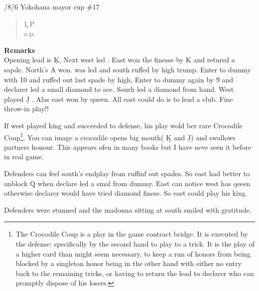 \vspace{0.5cm}
/8/6 Yokohana mayor cup \#17
\begin{quote}
%
  {}%
  {}
  {}%
  {}%
\end{quote}
\begin{quote}
\begin{bidding}
1\c  \> P  \s {}\h \\
a.p.
\end{bidding}
\end{quote}
{\bf Remarks}\\
Opening lead is \c K, Next west led . East won the
finesse by \s K and retured a sapde. North's \s A won. 
was led and south ruffed by high trump. Enter to dummy with 
\h 10 and ruffed out last spade by high, Enter to dummy again by \h 9
and declarer led a small diamond to ace. Sourh led a diamond from hand.
West played \d J . Alas east won by queen. All east could do is to lead a club.
Fine throw-in play!! 

If west played king and succeeded to defense,
his play wold ber rare Crocodile Coup\footnote{
The Crocodile Coup is a play in the game contract bridge. It is executed by the defense: specifically by the second hand to play to a trick. It is the play of a higher card than might seem necessary, to keep a run of honors from being blocked by a singleton honor being in the other hand with either no entry back to the remaining tricks, or having to return the lead to declarer who can promptly dispose of his losers. 
}.  You can image a crocodile opens big mouth( \d K and \d J) and
swallows partners honour. This appears ofen in many books but I 
have neve seen it before in real game.

Defenders can feel south's endplay from ruffinf out spades.
So east had better to unblock \d Q when declare led a smal from 
dummy. East can notice west has qeeen otherwise declarer would
have tried diamond finess. So east could play his king.

Defenders were stunned and the madonna sitting at south smiled with
gratitude. 

